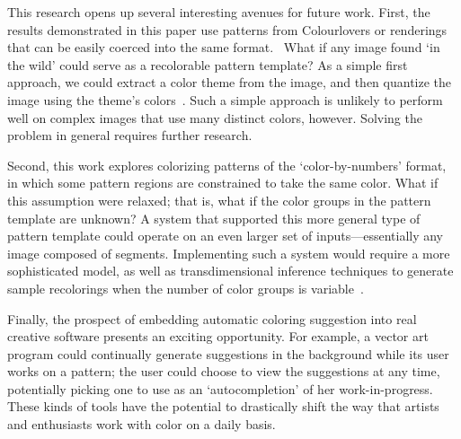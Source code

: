 This research opens up several interesting avenues for future work.
First, the results demonstrated in this paper use patterns from Colourlovers or renderings that can be easily coerced into the same format.~ What if any image found `in the wild' could serve as a recolorable pattern template? As a simple first approach, we could extract a color theme from the image, and then quantize the image using the theme's colors~\cite{SharonPaletteExtraction}. Such a simple approach is unlikely to perform well on complex images that use many distinct colors, however. Solving the problem in general requires further research.

Second, this work explores colorizing patterns of the `color-by-numbers' format, in which some pattern regions are constrained to take the same color. What if this assumption were relaxed; that is, what if the color groups in the pattern template are unknown? A system that supported this more general type of pattern template could operate on an even larger set of inputs---essentially any image composed of segments. Implementing such a system would require a more sophisticated model, as well as transdimensional inference techniques to generate sample recolorings when the number of color groups is variable~\cite{ReversibleJumpMCMC}.

Finally, the prospect of embedding automatic coloring suggestion into real creative software presents an exciting opportunity. For example, a vector art program could continually generate suggestions in the background while its user works on a pattern; the user could choose to view the suggestions at any time, potentially picking one to use as an `autocompletion' of her work-in-progress. These kinds of tools have the potential to drastically shift the way that artists and enthusiasts work with color on a daily basis. 

